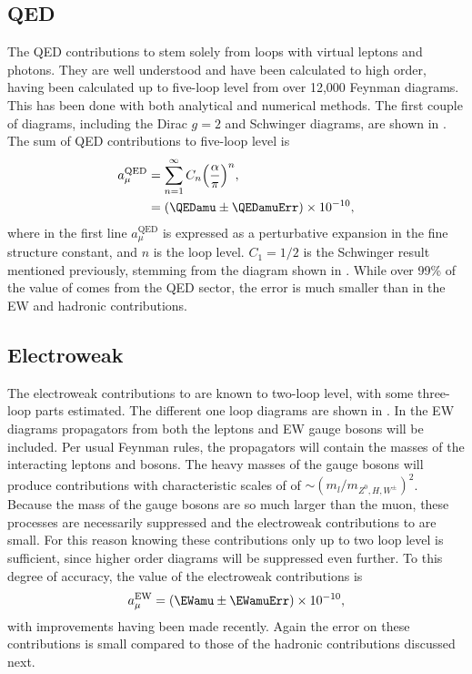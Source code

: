 \subsection{QED}
\label{subsec:QED}

The QED contributions to \amu stem solely from loops with virtual leptons and photons. They are well understood and have been calculated to high order, having been calculated up to five-loop level from over 12,000 Feynman diagrams. This has been done with both analytical and numerical methods. The first couple of diagrams, including the Dirac $g = 2$ and Schwinger diagrams, are shown in . The sum of QED contributions to five-loop level is \cite{Kinoshita1,Kinoshita2}
		\begin{equation}
		\begin{aligned}
            a_{\mu}^{\text{QED}} &= \sum_{n=1}^{\infty} C_{n} \Big( \frac{\alpha}{\pi} \Big)^{n}, \\
            					 &= (\QEDamu \pm \QEDamuErr) \times 10^{-10},
		\end{aligned}
		\end{equation}
where in the first line $a_{\mu}^{\text{QED}}$ is expressed as a perturbative expansion in the fine structure constant, and $n$ is the loop level. $C_{1} = 1/2$ is the Schwinger result mentioned previously, stemming from the diagram shown in . While over 99\% of the value of \amu comes from the QED sector, the error is much smaller than in the EW and hadronic contributions.


\subsection{Electroweak}
\label{subsec:Electroweak}

The electroweak contributions to \amu are known to two-loop level, with some three-loop parts estimated. The different one loop diagrams are shown in . In the EW diagrams propagators from both the leptons and EW gauge bosons will be included. Per usual Feynman rules, the propagators will contain the masses of the interacting leptons and bosons. The heavy masses of the gauge bosons will produce contributions with characteristic scales of of $\sim(m_{l}/m_{Z^{0},H,W^{\pm}})^{2}$. Because the mass of the gauge bosons are so much larger than the muon, these processes are necessarily suppressed and the electroweak contributions to \amu are small. For this reason knowing these contributions only up to two loop level is sufficient, since higher order diagrams will be suppressed even further. To this degree of accuracy, the value of the electroweak contributions is \cite{EW1,EW2}
		\begin{align}
            a_{\mu}^{\text{EW}} = (\EWamu \pm \EWamuErr) \times 10^{-10},
		\end{align}
with improvements having been made recently. Again the error on these contributions is small compared to those of the hadronic contributions discussed next.


